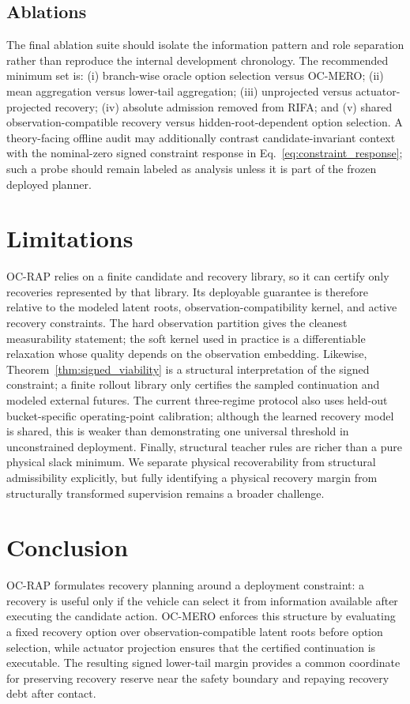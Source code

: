 \documentclass{article} %
\begin{document}
\subsection{Ablations}
The final ablation suite should isolate the information pattern and role separation rather than reproduce the internal development chronology. The recommended minimum set is: (i) branch-wise oracle option selection versus OC-MERO; (ii) mean aggregation versus lower-tail aggregation; (iii) unprojected versus actuator-projected recovery; (iv) absolute admission removed from RIFA; and (v) shared observation-compatible recovery versus hidden-root-dependent option selection. A theory-facing offline audit may additionally contrast candidate-invariant context with the nominal-zero signed constraint response in Eq.~\eqref{eq:constraint_response}; such a probe should remain labeled as analysis unless it is part of the frozen deployed planner.

\section{Limitations}
\label{sec:limitations}
OC-RAP relies on a finite candidate and recovery library, so it can certify only recoveries represented by that library. Its deployable guarantee is therefore relative to the modeled latent roots, observation-compatibility kernel, and active recovery constraints. The hard observation partition gives the cleanest measurability statement; the soft kernel used in practice is a differentiable relaxation whose quality depends on the observation embedding. Likewise, Theorem~\ref{thm:signed_viability} is a structural interpretation of the signed constraint; a finite rollout library only certifies the sampled continuation and modeled external futures. The current three-regime protocol also uses held-out bucket-specific operating-point calibration; although the learned recovery model is shared, this is weaker than demonstrating one universal threshold in unconstrained deployment. Finally, structural teacher rules are richer than a pure physical slack minimum. We separate physical recoverability from structural admissibility explicitly, but fully identifying a physical recovery margin from structurally transformed supervision remains a broader challenge.

\section{Conclusion}
\label{sec:conclusion}
OC-RAP formulates recovery planning around a deployment constraint: a recovery is useful only if the vehicle can select it from information available after executing the candidate action. OC-MERO enforces this structure by evaluating a fixed recovery option over observation-compatible latent roots before option selection, while actuator projection ensures that the certified continuation is executable. The resulting signed lower-tail margin provides a common coordinate for preserving recovery reserve near the safety boundary and repaying recovery debt after contact.
\end{document}
